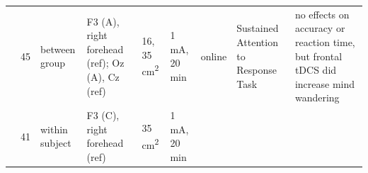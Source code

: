 \documentclass[11pt,]{memoir}
\begin{document}
\begin{longtable}[]{@{}lllllllll@{}}
\begin{minipage}[t]{0.08\columnwidth}
\textcite{Axelrod2015}\strut
\end{minipage} & \begin{minipage}[t]{0.02\columnwidth}\raggedright
45\strut
\end{minipage} & \begin{minipage}[t]{0.04\columnwidth}\raggedright
between
group\strut
\end{minipage} & \begin{minipage}[t]{0.13\columnwidth}\raggedright
F3 (A), right forehead (ref);
Oz (A), Cz (ref)\strut
\end{minipage} & \begin{minipage}[t]{0.03\columnwidth}\raggedright
16,
35
cm\textsuperscript{2}\strut
\end{minipage} & \begin{minipage}[t]{0.05\columnwidth}\raggedright
1 mA, 20
min\strut
\end{minipage} & \begin{minipage}[t]{0.06\columnwidth}\raggedright
online\strut
\end{minipage} & \begin{minipage}[t]{0.11\columnwidth}\raggedright
Sustained Attention to
Response Task\strut
\end{minipage} & \begin{minipage}[t]{0.24\columnwidth}\raggedright
no effects on accuracy or reaction time, but frontal
tDCS did increase mind wandering\strut
\end{minipage}\tabularnewline
\begin{minipage}[t]{0.08\columnwidth}\raggedright
\textcite{Nieratschker2015}\strut
\end{minipage} & \begin{minipage}[t]{0.02\columnwidth}\raggedright
41\strut
\end{minipage} & \begin{minipage}[t]{0.04\columnwidth}\raggedright
within
subject\strut
\end{minipage} & \begin{minipage}[t]{0.13\columnwidth}\raggedright
F3 (C), right forehead (ref)\strut
\end{minipage} & \begin{minipage}[t]{0.03\columnwidth}\raggedright
35
cm\textsuperscript{2}\strut
\end{minipage} & \begin{minipage}[t]{0.05\columnwidth}\raggedright
1 mA, 20
min\strut
\end{minipage} & \begin{minipage}[t]{0.06\columnwidth}\raggedright

\end{minipage}
\end{longtable}
\end{document}
